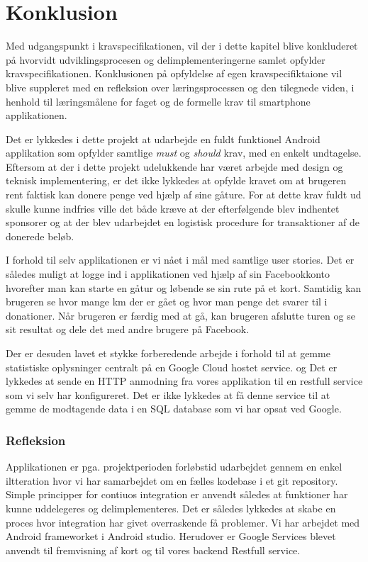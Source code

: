 \thispagestyle{fancy}
\chapter{Konklusion}
\label{chp:Konklusion}
Med udgangspunkt i kravspecifikationen, vil der i dette kapitel blive konkluderet på hvorvidt udviklingsprocesen og delimplementeringerne samlet opfylder kravspecifikationen. Konklusionen på opfyldelse af egen kravspecifiktaione vil blive suppleret med en refleksion over læringsprocessen og den tilegnede viden, i henhold til læringsmålene for faget og de formelle krav til smartphone applikationen.

Det er lykkedes i dette projekt at udarbejde en fuldt funktionel Android applikation som opfylder samtlige \emph{must} og \emph{should} krav, med en enkelt undtagelse. Eftersom at der i dette projekt udelukkende har været arbejde med design og teknisk implementering, er det ikke lykkedes at opfylde kravet om at brugeren rent faktisk kan donere penge ved hjælp af sine gåture. For at dette krav fuldt ud skulle kunne indfries ville det både kræve at der efterfølgende blev indhentet sponsorer og at der blev udarbejdet en logistisk procedure for transaktioner af de donerede beløb.

I forhold til selv applikationen er vi nået i mål med samtlige user stories. Det er således muligt at logge ind i applikationen ved hjælp af sin Facebookkonto hvorefter man kan starte en gåtur og løbende se sin rute på et kort. Samtidig kan brugeren se hvor mange km der er gået og hvor man penge det svarer til i donationer. Når brugeren er færdig med at gå, kan brugeren afslutte turen og se sit resultat og dele det med andre brugere på Facebook. 

Der er desuden lavet et stykke forberedende arbejde i forhold til at gemme statistiske oplysninger centralt på en Google Cloud hostet service. og Det er lykkedes at sende en HTTP anmodning fra vores applikation til en restfull service som vi selv har konfigureret. Det er ikke lykkedes at få denne service til at gemme de modtagende data i en SQL database som vi har opsat ved Google.

\subsection{Refleksion}
Applikationen er pga. projektperioden forløbstid udarbejdet gennem en enkel iltteration hvor vi har samarbejdet om en fælles kodebase i et git repository. Simple principper for contiuos integration er anvendt således at funktioner har kunne uddelegeres og delimplementeres. Det er således lykkedes at skabe en proces hvor integration har givet overraskende få problemer. Vi har arbejdet med Android frameworket i Android studio. Herudover er Google Services blevet anvendt til fremvisning af kort og til vores backend Restfull service.

